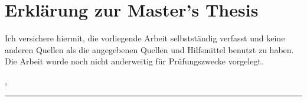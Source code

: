 \noindent

\chapter*{Erklärung zur Master's Thesis}

Ich versichere hiermit, die vorliegende Arbeit selbstständig verfasst und keine anderen Quellen als die angegebenen Quellen und Hilfsmittel benutzt zu haben. Die Arbeit wurde noch nicht anderweitig für Prüfungszwecke vorgelegt.

\vspace{10mm}
\noindent
\getSubmissionLocation{}, \getSubmissionDate{}

\vspace{20mm}
\noindent\rule{5cm}{.4pt}\hfill\par
\getAuthor{}

\cleardoublepage{}

